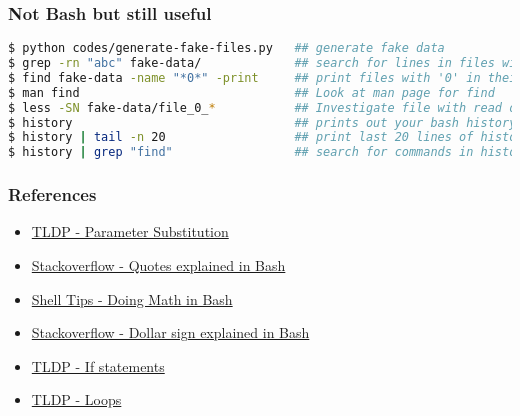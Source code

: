 \documentclass{beamer}
\begin{document}
\begin{frame}[fragile]
\frametitle{Not Bash but still useful}
\begingroup
\scriptsize
\begin{lstlisting}[backgroundcolor = \color{codegray}, language = Bash, showstringspaces=false]
$ python codes/generate-fake-files.py   ## generate fake data
$ grep -rn "abc" fake-data/             ## search for lines in files with "abc" in it
$ find fake-data -name "*0*" -print     ## print files with '0' in their name
$ man find                              ## Look at man page for find
$ less -SN fake-data/file_0_*           ## Investigate file with read only file viewer
$ history                               ## prints out your bash history (may be enourmous)
$ history | tail -n 20                  ## print last 20 lines of history, note pipe redirects
$ history | grep "find"                 ## search for commands in history where 'find' was used
\end{lstlisting}
\endgroup
\end{frame}





\begin{frame}
\frametitle{References}
\begin{itemize}
    \item \href{https://tldp.org/LDP/abs/html/parameter-substitution.html}{TLDP - Parameter Substitution}
    \bigskip
    \item \href{https://stackoverflow.com/questions/6697753/difference-between-single-and-double-quotes-in-bash}{Stackoverflow - Quotes explained in Bash }
    \bigskip
    \item \href{https://www.shell-tips.com/bash/math-arithmetic-calculation/}{Shell Tips - Doing Math in Bash}
    \bigskip
    \item \href{https://stackoverflow.com/a/5163260/4021436}{Stackoverflow - Dollar sign explained in Bash }
    \bigskip
    \item \href{https://tldp.org/LDP/Bash-Beginners-Guide/html/sect_07_01.html}{TLDP - If statements}
    \bigskip
    \item \href{https://tldp.org/LDP/abs/html/loops1.html}{TLDP - Loops }
\end{itemize}
\end{frame}





\end{document}
